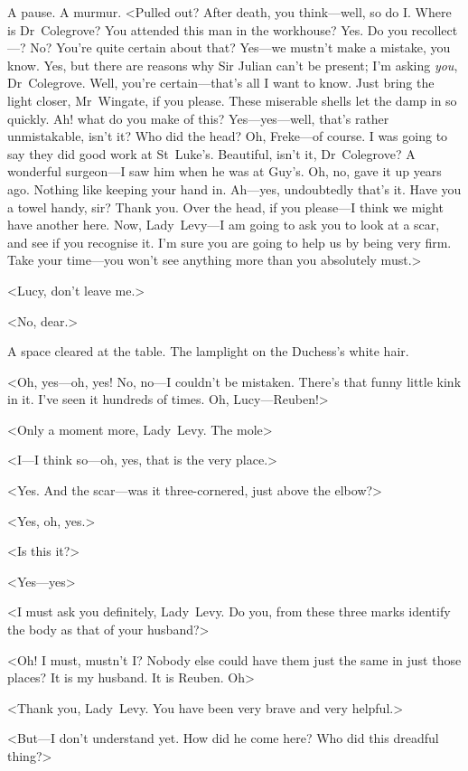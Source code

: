 A pause. A murmur. <Pulled out? After death, you think—well, so do I\@. Where is Dr~Colegrove? You attended this man in the workhouse? Yes. Do you recollect—? No? You're quite certain about that? Yes—we mustn't make a mistake, you know. Yes, but there are reasons why Sir Julian can't be present; I'm asking \textit{you}, Dr~Colegrove. Well, you're certain—that's all I want to know. Just bring the light closer, Mr~Wingate, if you please. These miserable shells let the damp in so quickly. Ah! what do you make of this? Yes—yes—well, that's rather unmistakable, isn't it? Who did the head? Oh, Freke—of course. I was going to say they did good work at St~Luke's. Beautiful, isn't it, Dr~Colegrove? A wonderful surgeon—I saw him when he was at Guy's. Oh, no, gave it up years ago. Nothing like keeping your hand in. Ah—yes, undoubtedly that's it. Have you a towel handy, sir? Thank you. Over the head, if you please—I think we might have another here. Now, Lady~Levy—I am going to ask you to look at a scar, and see if you recognise it. I'm sure you are going to help us by being very firm. Take your time—you won't see anything more than you absolutely must.>

<Lucy, don't leave me.>

<No, dear.>

A space cleared at the table. The lamplight on the Duchess's white hair.

<Oh, yes—oh, yes! No, no—I couldn't be mistaken. There's that funny little kink in it. I've seen it hundreds of times. Oh, Lucy—Reuben!>

<Only a moment more, Lady~Levy. The mole\longdash>

<I—I think so—oh, yes, that is the very place.>

<Yes. And the scar—was it three-cornered, just above the elbow?>

<Yes, oh, yes.>

<Is this it?>

<Yes—yes\longdash>

<I must ask you definitely, Lady~Levy. Do you, from these three marks identify the body as that of your husband?>

<Oh! I must, mustn't I\@? Nobody else could have them just the same in just those places? It is my husband. It is Reuben. Oh\longdash>

<Thank you, Lady~Levy. You have been very brave and very helpful.>

<But—I don't understand yet. How did he come here? Who did this dreadful thing?>

